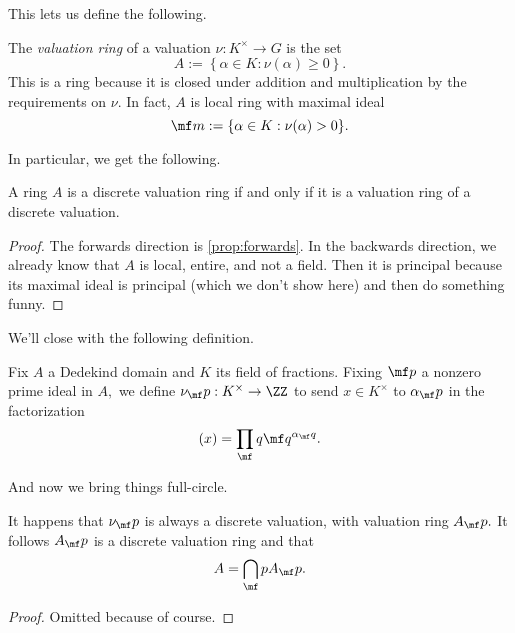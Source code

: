 This lets us define the following.
\begin{definition}
    The \textit{valuation ring} of a valuation $\nu:K^\times\to G$ is the set
    \[A:=\left\{\alpha\in K:\nu(\alpha)\ge0\right\}.\]
    This is a ring because it is closed under addition and multiplication by the requirements on $\nu.$ In fact, $A$ is local ring with maximal ideal
    \[\mf m:=\{\alpha\in K:\nu(\alpha)>0\}.\]
\end{definition}
In particular, we get the following.
\begin{proposition}
    A ring $A$ is a discrete valuation ring if and only if it is a valuation ring of a discrete valuation.
\end{proposition}
\begin{proof}
    The forwards direction is \autoref{prop:forwards}. In the backwards direction, we already know that $A$ is local, entire, and not a field. Then it is principal because its maximal ideal is principal (which we don't show here) and then do something funny.
\end{proof}
We'll close with the following definition.
\begin{definition}
    Fix $A$ a Dedekind domain and $K$ its field of fractions. Fixing $\mf p$ a nonzero prime ideal in $A,$ we define $\nu_\mf p:K^\times\to\ZZ$ to send $x\in K^\times$ to $\alpha_\mf p$ in the factorization
    \[(x)=\prod_\mf q\mf q^{\alpha_\mf q}.\]
\end{definition}
And now we bring things full-circle.
\begin{prop}
    It happens that $\nu_\mf p$ is always a discrete valuation, with valuation ring $A_\mf p.$ It follows $A_\mf p$ is a discrete valuation ring and that
    \[A=\bigcap_\mf pA_\mf p.\]
\end{prop}
\begin{proof}
    Omitted because of course.
\end{proof}